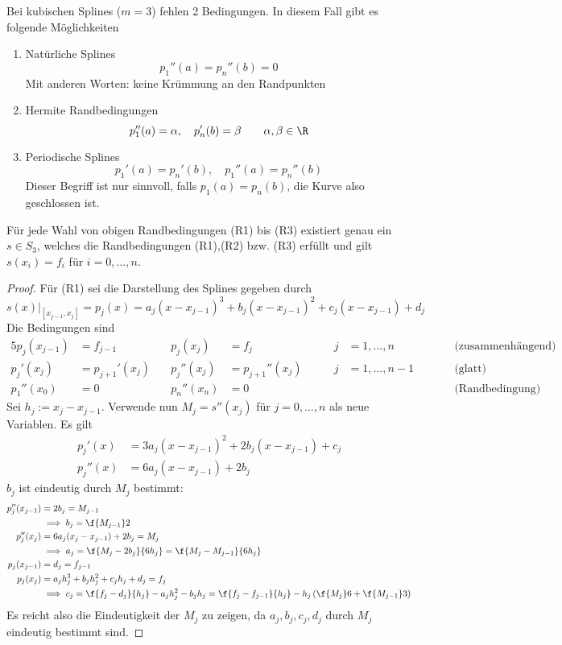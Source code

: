 \documentclass[a4paper,11pt]{scrartcl}
\begin{document}
Bei kubischen Splines ($m=3$) fehlen 2 Bedingungen.
In diesem Fall gibt es folgende Möglichkeiten
\begin{enumerate}[{(R}1{)}]
	\item
		Natürliche Splines
		\[
			p_1''(a) = p_n''(b)=0
		\]
		Mit anderen Worten: keine Krümmung an den Randpunkten
	\item
		Hermite Randbedingungen
		\[
			p_1''(a) = \alpha, \quad p_n'(b) = \beta \qquad \alpha,\beta\in \R
		\]
	\item
		Periodische Splines
		\[
			p_1'(a) = p_n'(b), \quad p_1''(a) = p_n''(b)
		\]
		Dieser Begriff ist nur sinnvoll, falls $p_1(a) = p_n(b)$, die Kurve also geschlossen ist.
\end{enumerate}

\begin{st}
	\label{1.32}
	Für jede Wahl von obigen Randbedingungen (R1) bis (R3) existiert genau ein $s\in S_3$, welches die Randbedingungen (R1),(R2) bzw. (R3) erfüllt und gilt $s(x_i)=f_i$ für $i=0,\dotsc,n$.
	\begin{proof}
		Für (R1) sei die Darstellung des Splines gegeben durch
		\[
			s(x)\big|_{[x_{j-1},x_j]} = p_j(x) = a_j(x-x_{j-1})^3 + b_j(x-x_{j-1})^2 + c_j(x-x_{j-1}) + d_j
		\]
		Die Bedingungen sind
		\begin{alignat*}{5}
			p_j(x_{j-1}) &= f_{j-1}& \quad p_j(x_j) &= f_j & \qquad j&=1,\dotsc,n & &\qquad \text{(zusammenhängend)} &\\
			p_j'(x_j) &= p_{j+1}'(x_j) & \quad p_j''(x_j) &= p_{j+1}''(x_j) &  \qquad j&=1,\dotsc,n-1 & &\qquad \text{(glatt)} &\\
			p_1''(x_0)&=0& \quad p_n''(x_n) &= 0 & & & &\qquad \text{(Randbedingung)} &
		\end{alignat*}
		Sei $h_j := x_j - x_{j-1}$.
		Verwende nun $M_j = s''(x_j)$ für $j=0,\dotsc,n$ als neue Variablen.
		Es gilt
		\begin{align*}
			p_j'(x) &= 3a_j(x-x_{j-1})^2 + 2b_j(x-x_{j-1})+c_j \\
			p_j''(x) &= 6a_j(x-x_{j-1}) + 2b_j
		\end{align*}
		$b_j$ ist eindeutig durch $M_j$ bestimmt:
		\begin{align*}
			p_j''(x_{j-1}) 
				&= 2b_j 
				= M_{j-1}  \\
				&\implies b_j
					=\f {M_{j-1}}2 \\
			p_j''(x_j) 
				&= 6a_j(x_j-x_{j-1}) + 2b_j 
				= M_j \\
				&\implies a_j 
					= \f {M_j - 2b_j}{6h_j} 
					= \f {M_j - M_{j-1}}{6h_j} \\
			p_j(x_{j-1}) 
				&= d_j 
				= f_{j-1} \\
			p_j(x_j) 
				&= a_j h_j^3 + b_jh_j^2 + c_jh_j + d_j 
				= f_j \\
				&\implies c_j 
					= \f{f_j-d_j}{h_j} - a_jh_j^2 - b_jh_j 
					= \f {f_j-f_{j-1}}{h_j} - h_j\left(\f {M_j}6 + \f{M_{j-1}}3 \right)
		\end{align*}
		Es reicht also die Eindeutigkeit der $M_j$ zu zeigen, da $a_j,b_j,c_j,d_j$ durch $M_j$ eindeutig bestimmt sind.


\end{proof}
\end{st}
\end{document}
